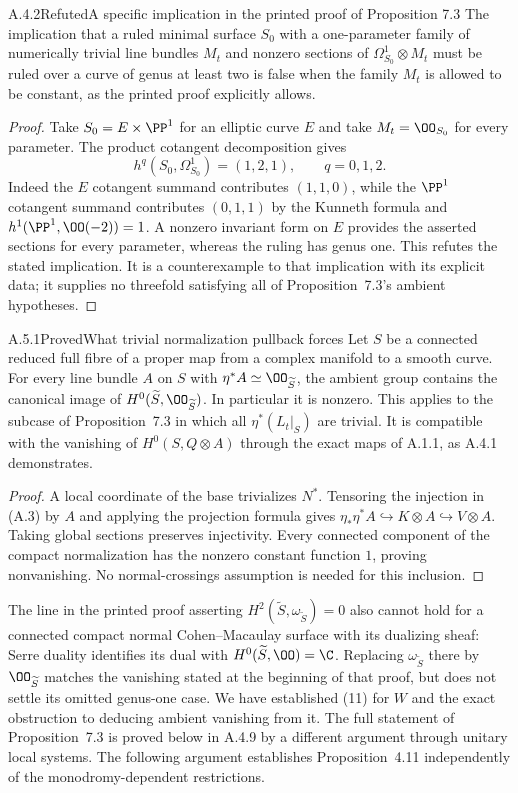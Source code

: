 \begin{statement}{A.4.2}{Refuted}{A specific implication in the printed proof of Proposition 7.3}
The implication that a ruled minimal surface $S_0$ with a one-parameter family of numerically trivial line bundles $M_t$ and nonzero sections of $\Omega^1_{S_0}\otimes M_t$ must be ruled over a curve of genus at least two is false when the family $M_t$ is allowed to be constant, as the printed proof explicitly allows.
\end{statement}
\begin{proof}
Take $S_0=E\times\PP^1$ for an elliptic curve $E$ and take $M_t=\OO_{S_0}$ for every parameter. The product cotangent decomposition gives
\[
 h^q(S_0,\Omega^1_{S_0})=(1,2,1),\qquad q=0,1,2.
\]
Indeed the $E$ cotangent summand contributes $(1,1,0)$, while the $\PP^1$ cotangent summand contributes $(0,1,1)$ by the Kunneth formula and $h^1(\PP^1,\OO(-2))=1$. A nonzero invariant form on $E$ provides the asserted sections for every parameter, whereas the ruling has genus one. This refutes the stated implication. It is a counterexample to that implication with its explicit data; it supplies no threefold satisfying all of Proposition~7.3's ambient hypotheses.
\end{proof}

\begin{statement}{A.5.1}{Proved}{What trivial normalization pullback forces}
Let $S$ be a connected reduced full fibre of a proper map from a complex manifold to a smooth curve. For every line bundle $A$ on $S$ with $\eta^*A\simeq\OO_{\widetilde S}$, the ambient group contains the canonical image of $H^0(\widetilde S,\OO_{\widetilde S})$. In particular it is nonzero. This applies to the subcase of Proposition~7.3 in which all $\eta^*(L_t|_S)$ are trivial. It is compatible with the vanishing of $H^0(S,Q\otimes A)$ through the exact maps of A.1.1, as A.4.1 demonstrates.
\end{statement}
\begin{proof}
A local coordinate of the base trivializes $N^*$. Tensoring the injection in (A.3) by $A$ and applying the projection formula gives
$\eta_*\eta^*A\hookrightarrow K\otimes A\hookrightarrow V\otimes A$.
Taking global sections preserves injectivity. Every connected component of the compact normalization has the nonzero constant function $1$, proving nonvanishing. No normal-crossings assumption is needed for this inclusion.
\end{proof}

The line in the printed proof asserting $H^2(\widetilde S,\omega_{\widetilde S})=0$ also cannot hold for a connected compact normal Cohen--Macaulay surface with its dualizing sheaf: Serre duality identifies its dual with $H^0(\widetilde S,\OO)=\C$. Replacing $\omega_{\widetilde S}$ there by $\OO_{\widetilde S}$ matches the vanishing stated at the beginning of that proof, but does not settle its omitted genus-one case. We have established (11) for $W$ and the exact obstruction to deducing ambient vanishing from it. The full statement of Proposition~7.3 is proved below in A.4.9 by a different argument through unitary local systems. The following argument establishes Proposition~4.11 independently of the monodromy-dependent restrictions.

